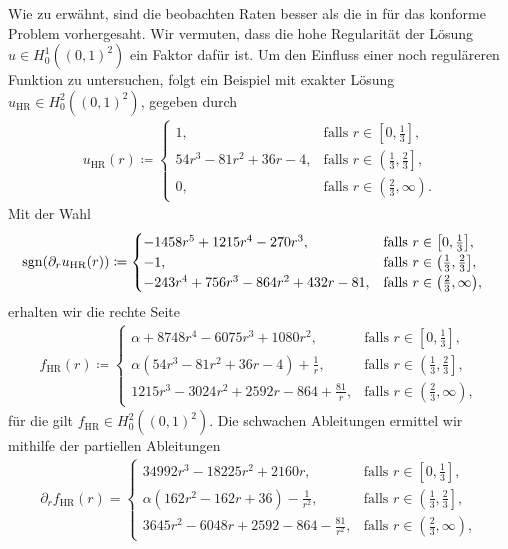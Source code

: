 Wie zu  erwähnt, sind die beobachten Raten besser
als die in \cite{Bar15} für das konforme Problem vorhergesaht.
Wir vermuten, dass die hohe Regularität der Lösung $u\in H^1_0\left(
(0,1)^2\right)$ ein Faktor dafür ist.
Um den Einfluss einer noch reguläreren Funktion zu untersuchen, folgt ein
Beispiel mit exakter Lösung $u_\textrm{HR} \in H^2_0\left((0,1)^2\right)$,
gegeben durch 
\begin{align*}
  u_\textrm{HR}(r)\coloneqq 
  \begin{cases}
    1, 
    & \text{falls } r\in\left[0, \frac{1}{3}\right]\!,\\
    54r^3 - 81r^2 + 36r - 4, 
    & \text{falls } r\in\left(\frac{1}{3}, \frac{2}{3}\right]\!,\\
    0, 
    & \text{falls } r\in\left(\frac{2}{3}, \infty\right)\!.
  \end{cases}
\end{align*}
Mit der Wahl
\begin{align*}
  \operatorname{sgn}&(\partial_r u_\textrm{HR}(r)) 
  \coloneqq 
  \begin{cases}
    -1458r^5 + 1215r^4 - 270r^3, 
    & \text{falls } r\in\left[0, \frac{1}{3}\right]\!,\\
    -1,
    & \text{falls } r\in\left(\frac{1}{3}, \frac{2}{3}\right]\!,\\
    -243r^4 + 756r^3 - 864r^2 + 432r - 81, 
    & \text{falls } r\in\left(\frac{2}{3}, \infty\right)\!,
  \end{cases}
\end{align*}
erhalten wir die rechte Seite
\begin{align*}
  f_\textrm{HR}(r)\coloneqq 
  \begin{cases}
    \alpha + 8748r^4 - 6075r^3 + 1080r^2, 
    & \text{falls } r\in\left[0, \frac{1}{3}\right]\!,\\
    \alpha\left(54r^3 - 81r^2 + 36r - 4\right) + \frac{1}{r}, 
    & \text{falls } r\in\left(\frac{1}{3}, \frac{2}{3}\right]\!,\\
    1215r^3 - 3024r^2 + 2592r - 864 + \frac{81}{r}, 
    & \text{falls } r\in\left(\frac{2}{3}, \infty\right)\!,
  \end{cases}
\end{align*}
für die gilt $f_\textrm{HR}\in H^2_0\left((0,1)^2\right)$.
Die schwachen Ableitungen ermittel wir mithilfe der partiellen Ableitungen
\begin{align*}
  \partial_r f_\textrm{HR}(r) =
  \begin{cases}
    34992r^3 - 18225r^2 + 2160r, 
    & \text{falls } r\in\left[0, \frac{1}{3}\right]\!,\\
    \alpha\left(162r^2 - 162r + 36\right) - \frac{1}{r^2}, 
    & \text{falls } r\in\left(\frac{1}{3}, \frac{2}{3}\right]\!,\\
    3645r^2 - 6048r + 2592 - 864 - \frac{81}{r^2}, 
    & \text{falls } r\in\left(\frac{2}{3}, \infty\right)\!,
  \end{cases}
\end{align*}
